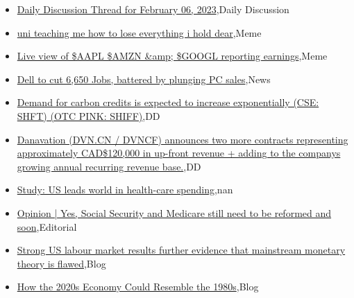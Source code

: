 \documentclass{article}%
\begin{document}
%
\begin{itemize}%
\item%
\href{https://reddit.com/r/wallstreetbets/comments/10v3ugl/daily\_discussion\_thread\_for\_february\_06\_2023/}{Daily Discussion Thread for February 06, 2023},Daily Discussion%
\item%
\href{https://reddit.com/r/wallstreetbets/comments/10v3gck/uni\_teaching\_me\_how\_to\_lose\_everything\_i\_hold\_dear/}{uni teaching me how to lose everything i hold dear},Meme%
\item%
\href{https://reddit.com/r/wallstreetbets/comments/10v1590/live\_view\_of\_aapl\_amzn\_googl\_reporting\_earnings/}{Live view of \$AAPL \$AMZN \&amp; \$GOOGL reporting earnings},Meme%
\item%
\href{https://reddit.com/r/wallstreetbets/comments/10v07kv/dell\_to\_cut\_6650\_jobs\_battered\_by\_plunging\_pc/}{Dell to cut 6,650 Jobs, battered by plunging PC sales},News%
\item%
\href{https://reddit.com/r/Baystreetbets/comments/10v5rvj/demand\_for\_carbon\_credits\_is\_expected\_to\_increase/}{Demand for carbon credits is expected to increase exponentially (CSE: SHFT) (OTC PINK: SHIFF)},DD%
\item%
\href{https://reddit.com/r/Baystreetbets/comments/10tljta/danavation\_dvncn\_dvncf\_announces\_two\_more/}{Danavation (DVN.CN / DVNCF) announces two more contracts representing approximately CAD\$120,000 in up-front revenue + adding to the companys growing annual recurring revenue base.},DD%
\item%
\href{https://reddit.com/r/Economics/comments/10v2eum/study\_us\_leads\_world\_in\_healthcare\_spending/}{Study: US leads world in health-care spending},nan%
\item%
\href{https://reddit.com/r/Economics/comments/10ux7br/opinion\_yes\_social\_security\_and\_medicare\_still/}{Opinion | Yes, Social Security and Medicare still need to be reformed  and soon},Editorial%
\item%
\href{https://reddit.com/r/Economics/comments/10uu1u2/strong\_us\_labour\_market\_results\_further\_evidence/}{Strong US labour market results  further evidence that mainstream monetary theory is flawed},Blog%
\item%
\href{https://reddit.com/r/Economics/comments/10utu8l/how\_the\_2020s\_economy\_could\_resemble\_the\_1980s/}{How the 2020s Economy Could Resemble the 1980s},Blog%
\end{itemize}%
\end{document}
